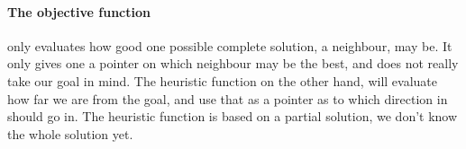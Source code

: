 \documentclass[11pt,a4paper]{article}
\begin{document}
\paragraph{The objective function} only evaluates how good one possible complete solution, a neighbour, may be. It only gives one a pointer on which neighbour may be the best, and does not really take our goal in mind. The heuristic function on the other hand, will evaluate how far we are from the goal, and use that as a pointer as to which direction in should go in. The heuristic function is based on a partial solution, we don't know the whole solution yet.
\end{document}
